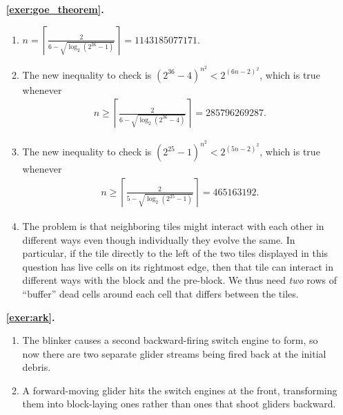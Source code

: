 \begin{multicols}{2}
\begin{itemize}[leftmargin=0em]
		
		\item[\bf\color{ocre}\sffamily\ref{exer:goe_theorem}.] \begin{enumerate}[leftmargin=1.5em,label=\bf\color{ocre}(\alph*)]
			\item $\displaystyle n =  \left\lceil \frac{2}{6-\sqrt{\log_2(2^{36}-1)}} \right\rceil = 1143185077171.$
		
			\item The new inequality to check is $(2^{36}-4)^{n^2} < 2^{(6n-2)^2}$, which is true whenever \begin{align*}n \geq \left\lceil \frac{2}{6-\sqrt{\log_2(2^{36}-4)}}\right\rceil = 285796269287.\end{align*}
			
			\item The new inequality to check is $(2^{25}-1)^{n^2} < 2^{(5n-2)^2}$, which is true whenever \begin{align*}n \geq \left\lceil \frac{2}{5-\sqrt{\log_2(2^{25}-1)}}\right\rceil = 465163192.\end{align*}
			
			\item The problem is that neighboring tiles might interact with each other in different ways even though individually they evolve the same. In particular, if the tile directly to the left of the two tiles displayed in this question has live cells on its rightmost edge, then that tile can interact in different ways with the block and the pre-block. We thus need \emph{two} rows of ``buffer'' dead cells around each cell that differs between the tiles.
		\end{enumerate}
	

		\item[\bf\color{ocre}\sffamily\ref{exer:ark}.] \begin{enumerate}[leftmargin=1.5em,label=\bf\color{ocre}(\alph*)]
		\item The blinker causes a second backward-firing switch engine to form, so now there are two separate glider streams being fired back at the initial debris.
		
		\item A forward-moving glider hits the switch engines at the front, transforming them into block-laying ones rather than ones that shoot gliders backward. \\
		\end{enumerate}
	\end{itemize}
\end{multicols}


